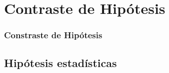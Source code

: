 
\section{Contraste de Hipótesis}

\begin{frame}
  \frametitle{Constraste de Hipótesis}
  \tableofcontents[sectionstyle=show/hide,hideothersubsections]
\end{frame}


\subsection{Hipótesis estadísticas}
\begin{frame}
  \frametitle{}

\end{frame}

